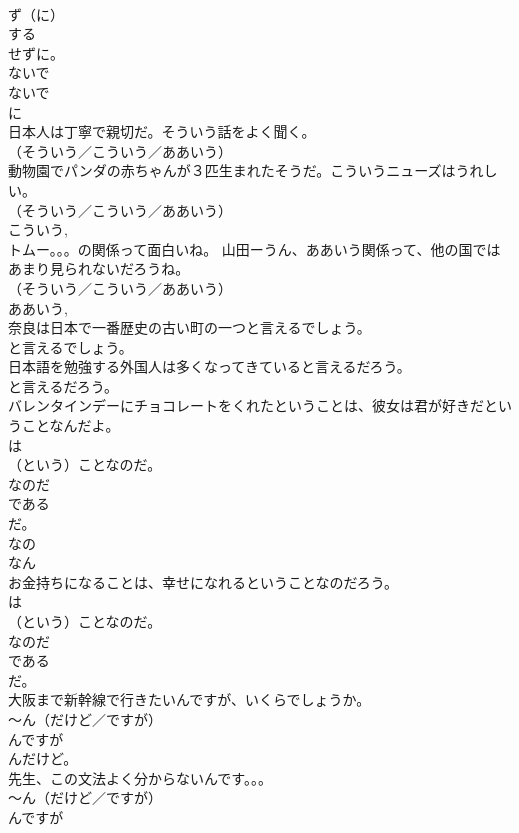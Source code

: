 \documentclass[8pt]{extreport}
\begin{document}
\begin{CJK}{UTF8}{min}
{\\	ず（に） 
\\	する 
\\	せずに。 
\\	ないで 
\\	ないで 
\\	に 
\\	日本人は丁寧で親切だ。そういう話をよく聞く。	
\\	（そういう／こういう／ああいう）
\\	動物園でパンダの赤ちゃんが３匹生まれたそうだ。こういうニューズはうれしい。	
\\	（そういう／こういう／ああいう）
\\	こういう, 
\\	トムー。。。の関係って面白いね。 山田ーうん、ああいう関係って、他の国ではあまり見られないだろうね。	
\\	（そういう／こういう／ああいう）
\\	ああいう, 
\\	奈良は日本で一番歴史の古い町の一つと言えるでしょう。	
\\	と言えるでしょう。 
\\	日本語を勉強する外国人は多くなってきていると言えるだろう。	
\\	と言えるだろう。 
\\	バレンタインデーにチョコレートをくれたということは、彼女は君が好きだということなんだよ。	
\\	は
\\	（という）ことなのだ。 
\\	なのだ 
\\	である 
\\	だ。
\\	なの 
\\	なん 
\\	お金持ちになることは、幸せになれるということなのだろう。	
\\	は
\\	（という）ことなのだ。 
\\	なのだ 
\\	である 
\\	だ。
\\	大阪まで新幹線で行きたいんですが、いくらでしょうか。	
\\	〜ん（だけど／ですが） 
\\	んですが 
\\	んだけど。
\\	先生、この文法よく分からないんです。。。	
\\	〜ん（だけど／ですが） 
\\	んですが 
}
\end{CJK}
\end{document}
